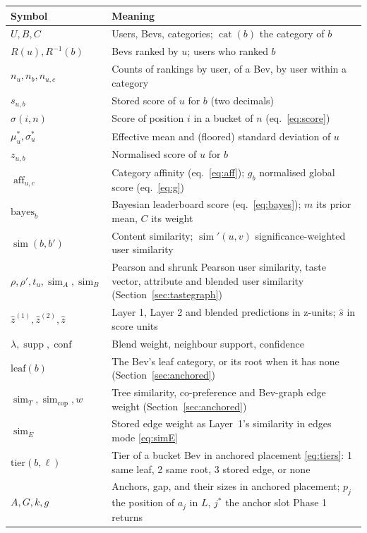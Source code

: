 \documentclass[11pt]{article}
\DeclareMathOperator{\simi}{sim}
\DeclareMathOperator{\aff}{aff}
\DeclareMathOperator{\conf}{conf}
\DeclareMathOperator{\supp}{supp}
\DeclareMathOperator{\cat}{cat}
\newcommand{\zhat}{\hat{z}}
\newcommand{\shat}{\hat{s}}
\theoremstyle{plain}
\theoremstyle{definition}
\theoremstyle{remark}
\begin{document}
\begin{center}
\small
\begin{tabular}{@{}lp{10cm}@{}}
\toprule
Symbol & Meaning \\
\midrule
$U, B, C$ & Users, Bevs, categories; $\cat(b)$ the category of $b$ \\
$R(u), R^{-1}(b)$ & Bevs ranked by $u$; users who ranked $b$ \\
$n_u, n_b, n_{u,c}$ & Counts of rankings by user, of a Bev, by user within a category \\
$s_{u,b}$ & Stored score of $u$ for $b$ (two decimals) \\
$\sigma(i, n)$ & Score of position $i$ in a bucket of $n$ (eq.~\ref{eq:score}) \\
$\mu^\ast_u, \sigma^\ast_u$ & Effective mean and (floored) standard deviation of $u$ \\
$z_{u,b}$ & Normalised score of $u$ for $b$ \\
$\aff_{u,c}$ & Category affinity (eq.~\ref{eq:aff}); $g_b$ normalised global score (eq.~\ref{eq:g}) \\
$\mathrm{bayes}_b$ & Bayesian leaderboard score (eq.~\ref{eq:bayes}); $m$ its prior mean, $C$ its weight \\
$\simi(b, b')$ & Content similarity; $\simi'(u, v)$ significance-weighted user similarity \\
$\rho, \rho', t_u, \simi_A, \simi_B$ & Pearson and shrunk Pearson user similarity, taste vector, attribute and blended user similarity (Section~\ref{sec:tastegraph}) \\
$\zhat^{(1)}, \zhat^{(2)}, \zhat$ & Layer 1, Layer 2 and blended predictions in z-units; $\shat$ in score units \\
$\lambda, \supp, \conf$ & Blend weight, neighbour support, confidence \\
$\mathrm{leaf}(b)$ & The Bev's leaf category, or its root when it has none (Section~\ref{sec:anchored}) \\
$\simi_T, \simi_{\mathrm{cop}}, w$ & Tree similarity, co-preference and Bev-graph edge weight (Section~\ref{sec:anchored}) \\
$\simi_E$ & Stored edge weight as Layer~1's similarity in edges mode \eqref{eq:simE} \\
$\mathrm{tier}(b, \ell)$ & Tier of a bucket Bev in anchored placement \eqref{eq:tiers}: 1 same leaf, 2 same root, 3 stored edge, or none \\
$A, G, k, g$ & Anchors, gap, and their sizes in anchored placement; $p_j$ the position of $a_j$ in $L$, $j^\ast$ the anchor slot Phase 1 returns \\

\end{tabular}
\end{center}
\end{document}
